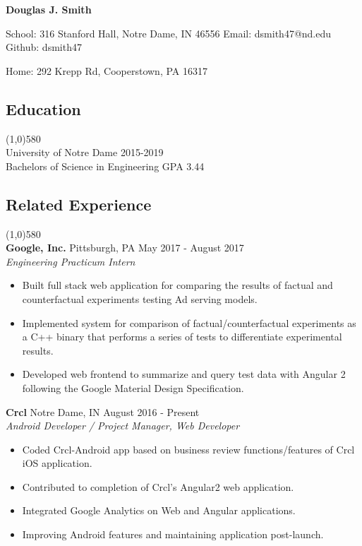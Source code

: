 \documentclass[9pt]{article}
\begin{document}
  \centerline{
    \LARGE\textbf{Douglas J. Smith}
  }
  \centerline{
    School: 316 Stanford Hall, Notre Dame, IN 46556
    Email: dsmith47@nd.edu
    Github: dsmith47
  }
  \centerline{
    Home: 292 Krepp Rd, Cooperstown, PA 16317
  }

  \vspace{-16pt}
  \subsection*{Education}
    \vspace{-16pt}
    \line(1,0){580}\\
    University of Notre Dame
    \hfill
    2015-2019
    \\
    Bachelors of Science in Engineering
    \hfill
    GPA 3.44
    \\
  \vspace{-28pt}
  \subsection*{Related Experience}
    \vspace{-16pt}
    \line(1,0){580}\\
    \textbf{Google, Inc.}
    \tab
    Pittsburgh, PA
    \hfill
    May 2017 - August 2017
    \\
    \textit{Engineering Practicum Intern}
    \begin{itemize}
      \item Built full stack web application for comparing the results of factual and counterfactual experiments testing Ad serving models.
      \item Implemented system for comparison of factual/counterfactual experiments as a C++ binary that performs a series of tests to differentiate experimental results.
      \item Developed web frontend to summarize and query test data with Angular 2 following the Google Material Design Specification.
    \end{itemize}
  
    \textbf{Crcl}
    \tab
    Notre Dame, IN
    \hfill
    August 2016 - Present
    \\
    \textit{Android Developer / Project Manager, Web Developer}
    \begin{itemize}
      \item Coded Crcl-Android app based on business review functions/features of Crcl iOS application.
      \item Contributed to completion of Crcl's Angular2 web application.
      \item Integrated Google Analytics on Web and Angular applications.
      \item Improving Android features and maintaining application post-launch.
    \end{itemize}
    
\end{document}
